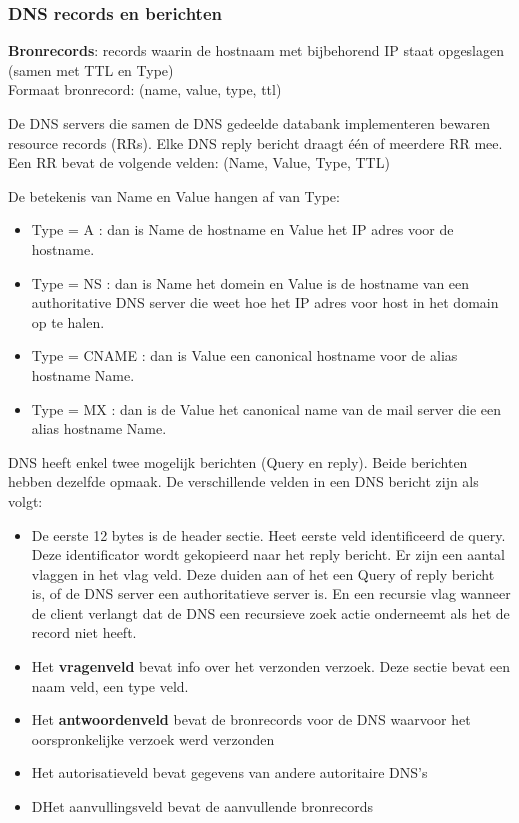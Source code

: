 \clearpage

\subsubsection{DNS records en berichten}

\textbf{Bronrecords}: records waarin de hostnaam met bijbehorend IP staat opgeslagen (samen met TTL en Type)\\
Formaat bronrecord: (name, value, type, ttl)

De DNS servers die samen de DNS gedeelde databank implementeren bewaren resource records (RRs). Elke DNS reply bericht draagt één of meerdere RR mee. Een RR bevat de volgende velden:
(Name, Value, Type, TTL)

De betekenis van Name en Value hangen af van Type:
\begin{itemize}
   \item Type = A : dan is Name de hostname en Value het IP adres voor de hostname.
 \item Type = NS : dan is Name het domein en Value is de hostname van een authoritative DNS server die weet hoe het IP adres voor host in het domain op te halen.
 \item Type = CNAME : dan is Value een canonical hostname voor de alias hostname Name.
 \item Type = MX : dan is de Value het canonical name van de mail server die een alias hostname Name.
\end{itemize}



DNS heeft enkel twee mogelijk berichten (Query en reply). Beide berichten hebben dezelfde opmaak. De verschillende velden in een DNS bericht zijn als volgt:
\begin{itemize}
   \item De eerste 12 bytes is de header sectie. Heet eerste veld identificeerd de query. Deze identificator wordt gekopieerd naar het reply bericht. Er zijn een aantal vlaggen in het vlag veld. Deze duiden aan of het een Query of reply bericht is, of de DNS server een authoritatieve server is. En een recursie vlag wanneer de client verlangt dat de DNS een recursieve zoek actie onderneemt als het de record niet heeft.
\item Het \textbf{vragenveld} bevat info over het verzonden verzoek. Deze sectie bevat een naam veld, een type veld.
\item Het \textbf{antwoordenveld} bevat de bronrecords voor de DNS waarvoor het oorspronkelijke verzoek werd verzonden
\item Het autorisatieveld bevat gegevens van andere autoritaire DNS’s
\item DHet aanvullingsveld bevat de aanvullende bronrecords
\end{itemize}


